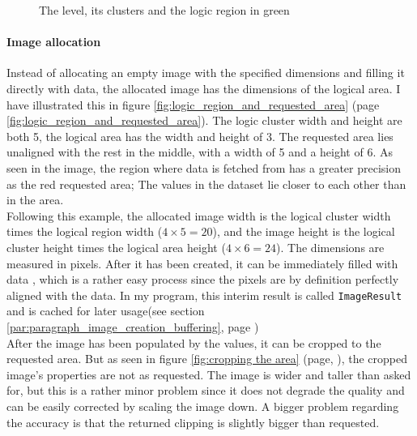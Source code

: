 \documentclass[10pt,a4paper,titlepage]{article}
\begin{document}
	\begin{figure}
		\centering
		\caption{The level, its clusters and the logic region in green}
		\label{fig:logic_region_over_dataset}
	\end{figure}
	\paragraph{Image allocation}
	Instead of allocating an empty image with the specified dimensions and filling it directly with data, the allocated image has the dimensions of the logical area. I have illustrated this in figure \ref{fig:logic_region_and_requested_area} (page \ref{fig:logic_region_and_requested_area}). The logic cluster width and height are both 5, the logical area has the width and height of 3. The requested area lies unaligned with the rest in the middle, with a width of 5 and a height of 6. As seen in the image, the region where data is fetched from has a greater precision as the red requested area; The values in the dataset lie closer to each other than in the area.\\
	Following this example, the allocated image width is the logical cluster width times the logical region width (\(4 \times 5 = 20\)), and the image height is the logical cluster height times the logical area height (\(4 \times 6 = 24\)). The dimensions are measured in pixels. After it has been created, it can be immediately filled with data , which is a rather easy process since the pixels are by definition perfectly aligned with the data. In my program, this interim result is called \verb|ImageResult| and is cached for later usage(see section \ref{par:paragraph_image_creation_buffering}, page \pageref{par:paragraph_image_creation_buffering}) \\
	After the image has been populated by the values, it can be cropped to the requested area. But as seen in figure \ref{fig:cropping the area} (page, \pageref{fig:cropping the area}), the cropped image's properties are not as requested. The image is wider and taller than asked for, but this is a rather minor problem since it does not degrade the quality and can be easily corrected by scaling the image down. A bigger problem regarding the accuracy is that the returned clipping is slightly bigger than requested.
	
\end{document}
